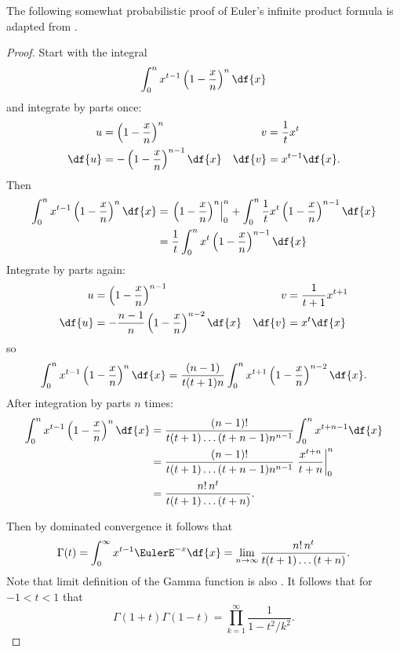 \documentclass[12pt]{article}
\begin{document}
The following somewhat probabilistic proof of Euler's infinite product
formula is adapted from
\cite{holst12}.
\begin{proof}
    Start with the integral
    \[
        \int_{0}^{n} x^{t-1}\left( 1 - \frac{x}{n} \right)^n \df{x}
    \] and integrate by parts once:
    \begin{align*}
        u &= \left(1-\frac{x}{n}\right)^n & v &= \frac{1}{t} x^{t} \\
        \df{u} &= -\left(1-\frac{x}{n}\right)^{n-1} \df{x} & \df{v} &= x^
        {t-1} \df{x}.  \\
    \end{align*}
    Then
    \begin{align*}
        \int_{0}^{n} x^{t-1}\left( 1 - \frac{x}{n} \right)^n \df{x} &=
        \left.  \left(1-\frac{x}{n}\right)^n \right|_{0}^{n} + \int_{0}^
        {n} \frac{1}{t} x^{t} \left(1-\frac{x}{n}\right)^{n-1} \df{x} \\
        &= \frac{1}{t} \int_{0}^{n} x^{t} \left(1-\frac{x}{n}\right)^{n-1}
        \df{x}
    \end{align*}
    Integrate by parts again:
    \begin{align*}
        u &= \left(1-\frac{x}{n}\right)^{n-1} & v &= \frac{1}{t+1} x^{t+1}
        \\
        \df{u} &= -\frac{n-1}{n} \left(1-\frac{x}{n}\right)^{n-2} \df{x}
        & \df{v} &= x^{t} \df{x} \\
    \end{align*}
    so
    \[
        \int_{0}^{n} x^{t-1}\left( 1 - \frac{x}{n} \right)^n \df{x} =
        \frac{(n-1)}{t(t+1)n} \int_{0}^{n} x^{t+1} \left(1-\frac{x}{n}\right)^
        {n-2} \df{x}.
    \] After integration by parts \( n \) times:
    \begin{align*}
        \int_{0}^{n} x^{t-1}\left( 1 - \frac{x}{n} \right)^n \df{x} &=
        \frac{(n-1)!}{t(t+1) \dots (t+n-1) n^{n-1}} \int_0^n x^{t+n-1}
        \df{x} \\
        &= \frac{(n-1)!}{t(t+1) \dots (t+n-1) n^{n-1}} \left.  \frac{x^{t+n}}
        {t+n} \right|_0^n \\
        &= \frac{n!  \, n^t}{t(t+1) \dots (t+n)}.
    \end{align*}

    Then by dominated convergence it follows that
    \[
        \Gamma(t) = \int_0^{\infty} x^{t-1} \EulerE^{-x} \df{x} = \lim_{n
        \to \infty} \frac{ n!\,n^t }{t(t+1)\dots(t+n)}.
    \] Note that limit definition of the Gamma function is also .  It follows that for \( -1 < t < 1
    \) that
    \[
        \Gamma(1 + t) \Gamma(1-t) = \prod_{k=1}^{\infty} \frac{1}{1 - t^2/k^2}.
    \]


\end{proof}
\end{document}

